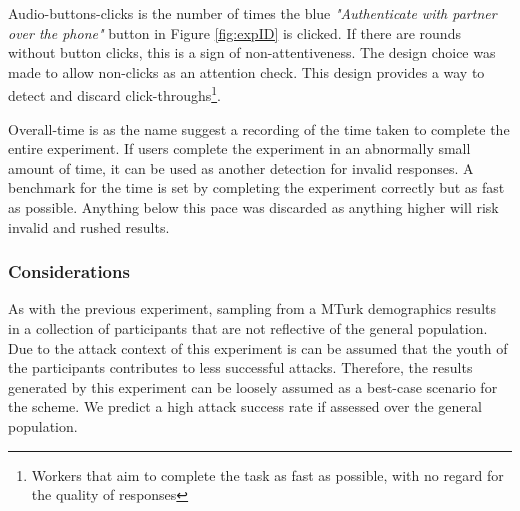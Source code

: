 Audio-buttons-clicks is the number of times the blue \textit{"Authenticate with partner over the phone"} button in Figure \ref{fig:expID} is clicked. If there are rounds without button clicks, this is a sign of non-attentiveness. The design choice was made to allow non-clicks as an attention check. This design provides a way to detect and discard click-throughs\footnote{Workers that aim to complete the task as fast as possible, with no regard for the quality of responses}. 

Overall-time is as the name suggest a recording of the time taken to complete the entire experiment. If users complete the experiment in an abnormally small amount of time, it can be used as another detection for invalid responses. A benchmark for the time is set by completing the experiment correctly but as fast as possible. Anything below this pace was discarded as anything higher will risk invalid and rushed results.

\subsubsection{Considerations}
As with the previous experiment, sampling from a  MTurk demographics results in a collection of participants that are not reflective of the general population. Due to the attack context of this experiment is can be assumed that the youth of the participants contributes to less successful attacks. Therefore, the results generated by this experiment can be loosely assumed as a best-case scenario for the scheme. We predict a high attack success rate if assessed over the general population.